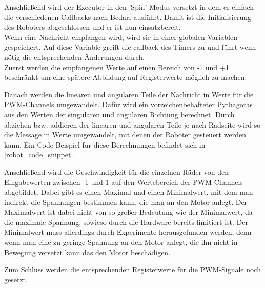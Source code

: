\begin{flushleft}
    Anschließend wird der Executor in den 'Spin'-Modus versetzt in dem er einfach die verschiedenen Callbacks nach Bedarf ausführt.
    Damit ist die Initialisierung des Roboters abgeschlossen und er ist nun einsatzbereit.\\

    Wenn eine Nachricht empfangen wird, wird sie in einer globalen Variablen gespeichert.
    Auf diese Variable greift die callback des Timers zu und führt wenn nötig die entsprechenden Änderungen durch.\\

    Zuerst werden die empfangenen Werte auf einen Bereich von -1 und +1 beschränkt um eine spätere Abbildung auf Registerwerte möglich zu machen.

    Danach werden die linearen und angularen Teile der Nachricht in Werte für die PWM-Channels umgewandelt.
    Dafür wird ein vorzeichenbehafteter Pythagoras aus den Werten der singularen und angularen Richtung berechnet.
    Durch abziehen bzw. addieren der linearen und angularen Teile je nach Radseite wird so die Message in Werte umgewandelt, mit denen der Roboter gesteuert werden kann.
    Ein Code-Beispiel für diese Berechnungen befindet sich in \ref{robot_code_snippet}.\newline

    Anschließend wird die Geschwindigkeit für die einzelnen Räder von den Eingabewerten zwischen -1 und 1 auf den Wertebereich der PWM-Channels abgebildet.
    Dabei gibt es einen Maximal und einen Minimalwert, mit dem man indirekt die Spannungen bestimmen kann, die man an den Motor anlegt.
    Der Maximalwert ist dabei nicht von so großer Bedeutung wie der Minimalwert, da die maximale Spannung, sowieso durch die Hardware bereits limitiert ist.
    Der Minimalwert muss allerdings durch Experimente herausgefunden werden, denn wenn man eine zu geringe Spannung an den Motor anlegt, die ihn nicht in Bewegung versetzt kann das den Motor beschädigen.

    Zum Schluss werden die entsprechenden Registerwerte für die PWM-Signale noch gesetzt.

\end{flushleft}